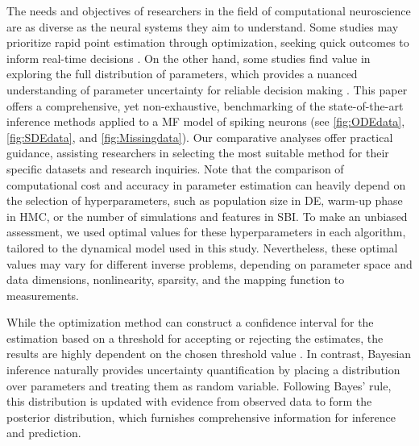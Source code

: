 \documentclass[preprint,11pt,authoryear]{elsarticle}
\begin{document}
The needs and objectives of researchers in the field of computational neuroscience are as diverse as the neural systems they aim to understand. Some studies may prioritize rapid point estimation through optimization, seeking quick outcomes to inform real-time decisions \citep{Vattikonda2021, Penas2023}. On the other hand, some studies find value in exploring the full distribution of parameters, which provides a nuanced understanding of parameter uncertainty for reliable decision making \citep{Hashemi2020, Jha2022}. This paper offers a comprehensive, yet non-exhaustive, benchmarking of the state-of-the-art inference methods applied to a MF model of spiking neurons (see \autoref{fig:ODEdata}, \autoref{fig:SDEdata}, and \autoref{fig:Missingdata}). Our comparative analyses offer practical guidance, assisting researchers in selecting the most suitable method for their specific datasets and research inquiries. Note that the comparison of computational cost and accuracy in parameter estimation can heavily depend on the selection of hyperparameters, such as population size in DE, warm-up phase in HMC, or the number of simulations and features in SBI. To make an unbiased assessment, we used optimal values for these hyperparameters in each algorithm, tailored to the dynamical model used in this study. Nevertheless, these optimal values may vary for different inverse problems, depending on parameter space and data dimensions, nonlinearity, sparsity, and the mapping function to measurements.

While the optimization method can construct a confidence interval for the estimation based on a threshold for accepting or rejecting the estimates, the results are highly dependent on the chosen threshold value \citep{Beaumont2002, Cranmer2020}. In contrast, Bayesian inference naturally provides uncertainty quantification by placing a distribution over parameters and treating them as random variable. Following Bayes' rule, this distribution is updated with evidence from observed data to form the posterior distribution, which furnishes comprehensive information for inference and prediction. 
\end{document}
